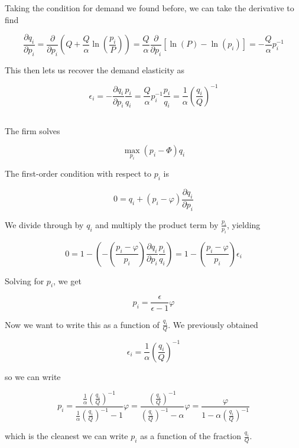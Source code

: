 \documentclass[12pt, letterpaper]{article}
\begin{document}
    Taking the condition for demand we found before, we can take the derivative to find

    \[ \frac{\partial q_i}{\partial p_i} = \frac{\partial}{\partial p_i} \left(Q + \frac{Q}{\alpha } \ln(\frac{p_i}{P})\right) = \frac{Q}{\alpha} \frac{\partial}{\partial p_i} \left[ \ln(P) - \ln(p_i) \right] = - \frac{Q}{\alpha} p_i^{-1}     \]

    This then lets us recover the demand elasticity as

    \[ \epsilon_i = - \frac{\partial q_i}{\partial p_i} \frac{p_i}{q_i} = \frac{Q}{\alpha} p_i^{-1} \frac{p_i}{q_i} = \frac{1}{\alpha} \left(\frac{q_i}{Q}\right)^{-1}  \]

    \subsection{}

    The firm solves 

    \[ \max_{p_i} \left(p_i - \varPhi\right) q_i   \]

    The first-order condition with respect to \(p_i\) is 

    \[ 0 = q_i + \left(p_i - \varphi\right) \frac{\partial q_i}{\partial p_i}    \]

    We divide through by \(q_i\) and multiply the product term by \(\frac{p_i}{p_i}\), yielding

    \[ 0 = 1 - \left( - \left( \frac{p_i - \varphi}{p_i} \right)   \frac{\partial q_i}{\partial p_i} \frac{p_i}{q_i}\right) = 1 - \left(\frac{p_i - \varphi}{p_i}\right) \epsilon_i    \]

    Solving for \(p_i\), we get 

    \[ p_i = \frac{\epsilon}{\epsilon - 1} \varphi   \]

    Now we want to write this as a function of \(\frac{q_i}{Q}\). We previously obtained 

    \[ \epsilon_i = \frac{1}{\alpha} \left(\frac{q_i}{Q}\right)^{-1} \]

    so we can write 

    \[ p_i = \frac{\frac{1}{\alpha} \left(\frac{q_i}{Q}\right)^{-1}}{\frac{1}{\alpha} \left(\frac{q_i}{Q}\right)^{-1} - 1} \varphi = \frac{\left(\frac{q_i}{Q}\right)^{-1}}{\left(\frac{q_i}{Q}\right)^{-1} - \alpha} \varphi = \frac{\varphi}{1 - \alpha \left(\frac{q_i}{Q}\right)^{-1}}   \]

    which is the cleanest we can write \(p_i\) as a function of the fraction \(\frac{q_i}{Q}\).
\end{document}
